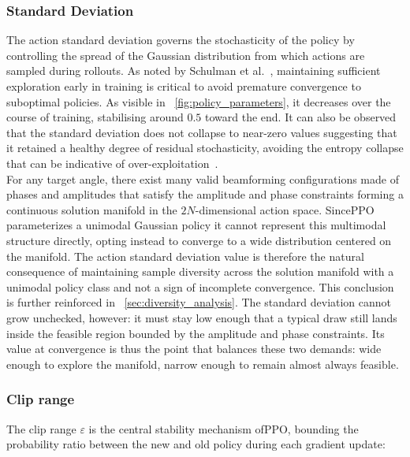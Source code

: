 \subsubsection{Standard Deviation}
The action standard deviation governs the stochasticity of the policy by controlling the spread of the Gaussian distribution from which actions are sampled during rollouts. As noted by Schulman et al.~\cite{schulman2017ppo}, maintaining sufficient exploration early in training is critical to avoid premature convergence to suboptimal policies. As visible in \figurename~\ref{fig:policy_parameters}, it decreases over the course of training, stabilising around $0.5$ toward the end. It can also be observed that the standard deviation does not collapse to near-zero values suggesting that it retained a healthy degree of residual stochasticity, avoiding the entropy collapse that can be indicative of over-exploitation~\cite{ahmed2019entropy}.\\
For any target angle, there exist many valid beamforming configurations made of phases and amplitudes that satisfy the amplitude and phase constraints forming a continuous solution manifold in the $2N$-dimensional action space. Since\gls{PPO} parameterizes a unimodal Gaussian policy it cannot represent this multimodal structure directly, opting instead to converge to a wide distribution centered on the manifold. The action standard deviation value is therefore the natural consequence of maintaining sample diversity across the solution manifold with a unimodal policy class and not a sign of incomplete convergence. This conclusion is further reinforced in \sectionname~\ref{sec:diversity_analysis}. The standard deviation cannot grow unchecked, however: it must stay low enough that a typical draw still lands inside the feasible region bounded by the amplitude and phase constraints. Its value at convergence is thus the point that balances these two demands: wide enough to explore the manifold, narrow enough to remain almost always feasible.

\subsubsection{Clip range}

The clip range $\varepsilon$ is the central stability mechanism of\gls{PPO}, bounding the probability ratio between the new and old policy during each gradient update:


